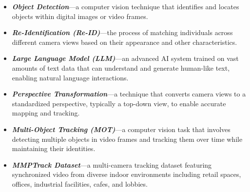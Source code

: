 \begin{itemize}[leftmargin=40pt]
    \item \textbf{\textit{Object Detection}}---a computer vision technique that identifies and locates objects within digital images or video frames.
    \item \textbf{\textit{Re-Identification (Re-ID)}}---the process of matching individuals across different camera views based on their appearance and other characteristics.
    \item \textbf{\textit{Large Language Model (LLM)}}---an advanced AI system trained on vast amounts of text data that can understand and generate human-like text, enabling natural language interactions.
    \item \textbf{\textit{Perspective Transformation}}---a technique that converts camera views to a standardized perspective, typically a top-down view, to enable accurate mapping and tracking.
    \item \textbf{\textit{Multi-Object Tracking (MOT)}}---a computer vision task that involves detecting multiple objects in video frames and tracking them over time while maintaining their identities.
    \item \textbf{\textit{MMPTrack Dataset}}---a multi-camera tracking dataset featuring synchronized video from diverse indoor environments including retail spaces, offices, industrial facilities, cafes, and lobbies.
\end{itemize}